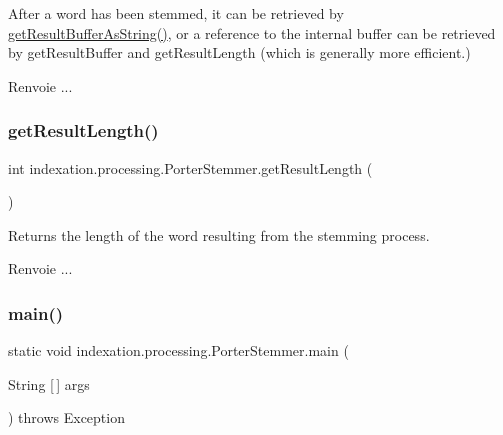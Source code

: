 After a word has been stemmed, it can be retrieved by \hyperlink{classindexation_1_1processing_1_1PorterStemmer_a67d818639497e0dad6ced251e5562be8}{get\+Result\+Buffer\+As\+String()}, or a reference to the internal buffer can be retrieved by get\+Result\+Buffer and get\+Result\+Length (which is generally more efficient.)

\begin{DoxyReturn}{Renvoie}
... 
\end{DoxyReturn}
\mbox{\label{classindexation_1_1processing_1_1PorterStemmer_a1009cbe95a2ba30b6665848e8b0d6208}} 
\subsubsection{\texorpdfstring{get\+Result\+Length()}{getResultLength()}}
{\footnotesize\ttfamily int indexation.\+processing.\+Porter\+Stemmer.\+get\+Result\+Length (\begin{DoxyParamCaption}{ }\end{DoxyParamCaption})}

Returns the length of the word resulting from the stemming process.

\begin{DoxyReturn}{Renvoie}
... 
\end{DoxyReturn}
\mbox{\label{classindexation_1_1processing_1_1PorterStemmer_a893422ac6f517cc2e2f1f12f049918a4}} 
\subsubsection{\texorpdfstring{main()}{main()}}
{\footnotesize\ttfamily static void indexation.\+processing.\+Porter\+Stemmer.\+main (\begin{DoxyParamCaption}\item[{String \mbox{[}$\,$\mbox{]}}]{args }\end{DoxyParamCaption}) throws Exception\hspace{0.3cm}{\ttfamily [static]}}

